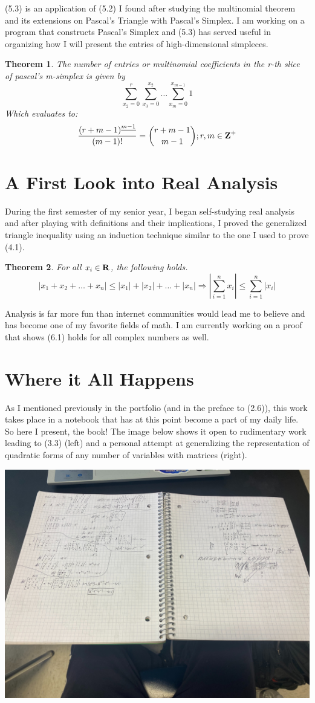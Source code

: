 \documentclass{article}
\newtheorem{theorem}{Theorem}[section]
\begin{document}
(5.3) is an application of (5.2) I found after studying the multinomial theorem and its extensions on Pascal's Triangle with Pascal's Simplex. I am working on a program that constructs Pascal's Simplex and (5.3) has served useful in organizing how I will present the entries of high-dimensional simpleces.

\begin{theorem}
    The number of entries or multinomial coefficients in the r-th slice of pascal's m-simplex is given by 
    $$\sum_{x_2 = 0}^{r}\sum_{x_3 = 0}^{x_2}\dots\sum_{x_{m} = 0}^{x_{m-1}}1$$
    Which evaluates to:
    $$\frac{{(r+m-1)}^{\underline{m-1}}}{(m-1)!}={{r+m-1} \choose {m-1}};r,m\in\mbox{\textbf{Z}}^+$$
\end{theorem}

\section{A First Look into Real Analysis}
During the first semester of my senior year, I began self-studying real analysis and after playing with definitions and their implications, I proved the generalized triangle inequality using an induction technique similar to the one I used to prove (4.1).
\begin{theorem}
    For all $x_i\in\mbox{\textbf{R}}$, the following holds.
    \[|x_1+x_2+\dots+x_n|\leq |x_1|+|x_2|+\dots+|x_n|\Rightarrow |\sum_{i=1}^n x_i|\leq \sum_{i=1}^n |x_i|\]
\end{theorem}
Analysis is far more fun than internet communities would lead me to believe and has become one of my favorite fields of math. I am currently working on a proof that shows (6.1) holds for all complex numbers as well. 


\newpage

\section{Where it All Happens}
As I mentioned previously in the portfolio (and in the preface to (2.6)), this work takes place in a notebook that has at this point become a part of my daily life. So here I present, the book! The image below shows it open to rudimentary work leading to (3.3) (left) and a personal attempt at generalizing the representation of quadratic forms of any number of variables with matrices (right).

\begin{center}
\includegraphics[scale=0.12]{image}
\end{center}
\end{document}
